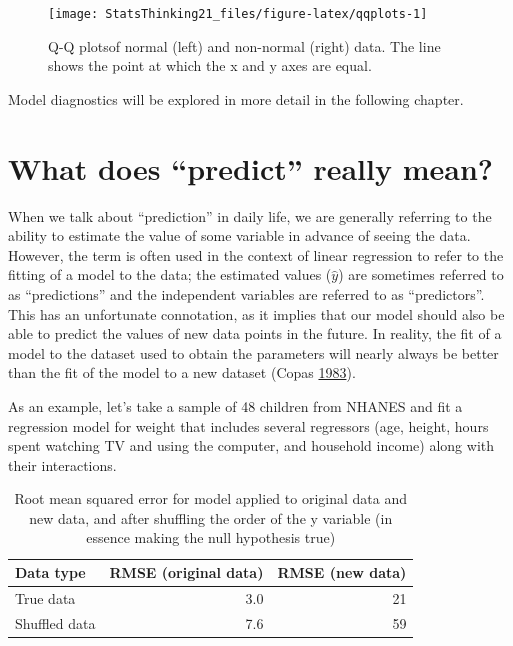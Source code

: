 \documentclass[12pt,]{book}
\theoremstyle{definition}
\theoremstyle{definition}
\theoremstyle{definition}
\theoremstyle{remark}
\begin{document}
\begin{figure}
\texttt{[image: StatsThinking21\_files/figure-latex/qqplots-1]} \caption{Q-Q plotsof normal (left) and non-normal (right) data.  The line shows the point at which the x and y axes are equal.}\label{fig:qqplots}
\end{figure}

Model diagnostics will be explored in more detail in the following chapter.

\hypertarget{what-does-predict-really-mean}{%
\section{What does ``predict'' really mean?}\label{what-does-predict-really-mean}}

When we talk about ``prediction'' in daily life, we are generally referring to the ability to estimate the value of some variable in advance of seeing the data. However, the term is often used in the context of linear regression to refer to the fitting of a model to the data; the estimated values (\(\hat{y}\)) are sometimes referred to as ``predictions'' and the independent variables are referred to as ``predictors''. This has an unfortunate connotation, as it implies that our model should also be able to predict the values of new data points in the future. In reality, the fit of a model to the dataset used to obtain the parameters will nearly always be better than the fit of the model to a new dataset (Copas \protect\hyperlink{ref-copa:1983}{1983}).

As an example, let's take a sample of 48 children from NHANES and fit a regression model for weight that includes several regressors (age, height, hours spent watching TV and using the computer, and household income) along with their interactions.

\begin{table}

\caption{\label{tab:unnamed-chunk-108}Root mean squared error for model applied to original data and new data, and after shuffling the order of the y variable (in essence making the null hypothesis true)}
\centering
\begin{tabular}[t]{l|r|r}
\hline
Data type & RMSE (original data) & RMSE (new data)\\
\hline
True data & 3.0 & 21\\
\hline
Shuffled data & 7.6 & 59\\
\hline
\end{tabular}
\end{table}
\end{document}
